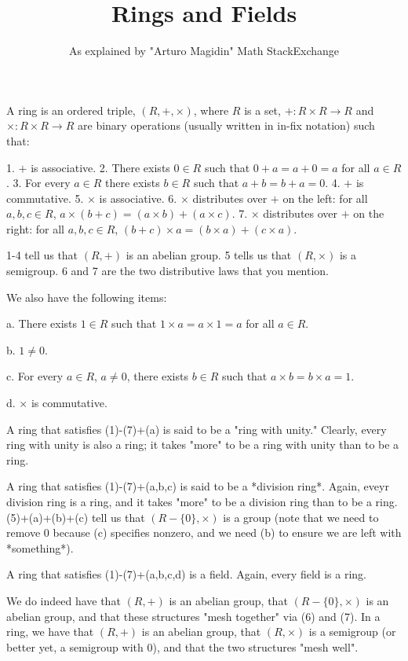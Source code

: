 \documentclass[12pt]{article}
\begin{document}
\title{Rings and Fields}
\author{As explained by "Arturo Magidin" Math StackExchange\cite{mathse}}
\maketitle

A ring is an ordered triple, $(R,+,\times)$, where $R$ is a set, $+\colon R\times R\to R$ and $\times\colon R\times R\to R$ are binary operations (usually written in in-fix notation) such that:

1. $+$ is associative.
2. There exists $0\in R$ such that $0+a=a+0=a$ for all $a\in R$.
3. For every $a\in R$ there exists $b\in R$ such that $a+b=b+a=0$.
4. $+$ is commutative.
5. $\times$ is associative.
6. $\times$ distributes over $+$ on the left: for all $a,b,c\in R$, $a\times(b+c) = (a\times b)+(a\times c)$.
7. $\times$ distributes over $+$ on the right: for all $a,b,c\in R$, $(b+c)\times a = (b\times a)+(c\times a)$.

1-4 tell us that $(R,+)$ is an abelian group. 5 tells us that $(R,\times)$ is a semigroup. 6 and 7 are the two distributive laws that you mention.

We also have the following items:

a. There exists $1\in R$ such that $1\times a = a\times 1 = a$ for all $a\in R$.

b. $1\neq 0$.

c. For every $a\in R$, $a\neq 0$, there exists $b\in R$ such that $a\times b = b\times a = 1$.

d. $\times$ is commutative.


A ring that satisfies (1)-(7)+(a) is said to be a "ring with unity." Clearly, every ring with unity is also a ring; it takes "more" to be a ring with unity than to be a ring.

A ring that satisfies (1)-(7)+(a,b,c) is said to be a *division ring*. Again, eveyr division ring is a ring, and it takes "more" to be a division ring than to be a ring. (5)+(a)+(b)+(c) tell us that $(R-\{0\},\times)$ is a group (note that we need to remove $0$ because (c) specifies nonzero, and we need (b) to ensure we are left with *something*).

A ring that satisfies (1)-(7)+(a,b,c,d) is a field.  Again, every field is a ring.

We do indeed have that $(R,+)$ is an abelian group, that $(R-\{0\},\times)$ is an abelian group, and that these structures "mesh together" via (6) and (7). In a ring, we have that $(R,+)$ is an abelian group, that $(R,\times)$ is a semigroup (or better yet, a semigroup with $0$), and that the two structures "mesh well".
\end{document}
